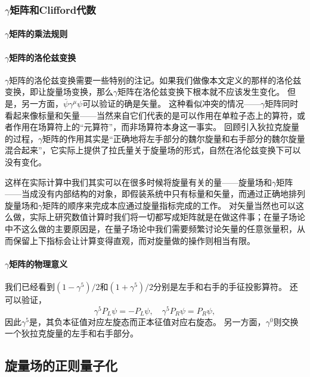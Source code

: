 \subsubsection{$\gamma$矩阵和Clifford代数}

\paragraph{$\gamma$矩阵的乘法规则}

\paragraph{$\gamma$矩阵的洛伦兹变换} %

$\gamma$矩阵的洛伦兹变换需要一些特别的注记。如果我们做像本文定义的那样的洛伦兹变换，即让旋量场变换，那么$\gamma$矩阵在洛伦兹变换下根本就不应该发生变化。
但是，另一方面，$\bar{\psi} \gamma^\mu \psi$可以验证的确是矢量。
这种看似冲突的情况——$\gamma$矩阵同时看起来像标量和矢量——当然来自它们代表的是可以作用在单粒子态上的算符，或者作用在场算符上的“元算符”，而非场算符本身这一事实。
回顾引入狄拉克旋量的过程，$\gamma$矩阵的作用其实是“正确地将左手部分的魏尔旋量和右手部分的魏尔旋量混合起来”，它实际上提供了拉氏量关于旋量场的形式，自然在洛伦兹变换下可以没有变化。

这样在实际计算中我们其实可以在很多时候将旋量有关的量——旋量场和$\gamma$矩阵——当成没有内部结构的对象，即假装系统中只有标量和矢量，而通过正确地排列旋量场和$\gamma$矩阵的顺序来完成本应通过旋量指标完成的工作。
对矢量当然也可以这么做，实际上研究数值计算时我们将一切都写成矩阵就是在做这件事；在量子场论中不这么做的主要原因是，在量子场论中我们需要频繁讨论矢量的任意张量积，从而保留上下指标会让计算变得直观，而对旋量做的操作则相当有限。

\paragraph{$\gamma$矩阵的物理意义} 我们已经看到$(1-\gamma^5)/2$和$(1+\gamma^5)/2$分别是左手和右手的手征投影算符。
还可以验证，
\begin{equation}
    \gamma^5 P_L \psi = - P_L \psi, \quad \gamma^5 P_R \psi = P_R \psi,
\end{equation}
因此$\gamma^5$是，其负本征值对应左旋态而正本征值对应右旋态。
另一方面，$\gamma^0$则交换一个狄拉克旋量的左手和右手部分。

\subsection{旋量场的正则量子化}

